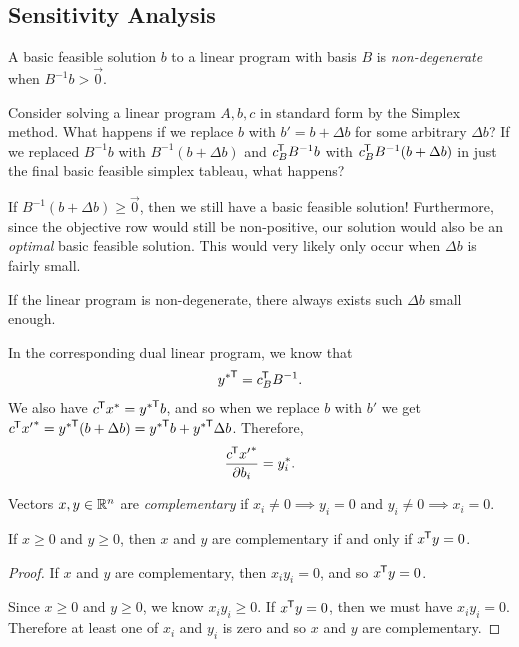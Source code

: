 \subsection{Sensitivity Analysis}

\begin{defn}
    A basic feasible solution $b$ to a linear program with basis $B$ is \emph{non-degenerate} when $B^{-1}b > \vec{0}$.
\end{defn}

Consider solving a linear program $A, b, c$ in standard form by the Simplex method. What happens if we replace $b$ with $b' = b + \Delta b$ for some arbitrary $\Delta b$? If we replaced $B^{-1}b$ with $B^{-1}(b + \Delta b)$ and $c_B^{\mkern-1.5mu\mathsf{T}}B^{-1}b$ with $c_B^{\mkern-1.5mu\mathsf{T}}B^{-1}(b + \Delta b)$ in just the final basic feasible simplex tableau, what happens?

If $B^{-1}(b + \Delta b) \geq \vec{0}$, then we still have a basic feasible solution! Furthermore, since the objective row would still be non-positive, our solution would also be an \emph{optimal} basic feasible solution. This would very likely only occur when $\Delta b$ is fairly small.

If the linear program is non-degenerate, there always exists such $\Delta b$ small enough.

In the corresponding dual linear program, we know that
\begin{align*}
    {y^*}^{\mkern-1.5mu\mathsf{T}} = c_B^{\mkern-1.5mu\mathsf{T}}B^{-1}.
\end{align*}
We also have $c^{\mkern-1.5mu\mathsf{T}}x^* = {y^*}^{\mkern-1.5mu\mathsf{T}}b$, and so when we replace $b$ with $b'$ we get
$c^{\mkern-1.5mu\mathsf{T}}{x'}^{*} = {y^*}^{\mkern-1.5mu\mathsf{T}}(b + \Delta b) = {y^*}^{\mkern-1.5mu\mathsf{T}}b + {y^*}^{\mkern-1.5mu\mathsf{T}}\Delta b$. Therefore,
\begin{align*}
    \frac{c^{\mkern-1.5mu\mathsf{T}}{x'}^{*}}{\partial b_i} = y_i^*.
\end{align*}

\begin{defn}
    Vectors $x, y \in \mathbb{R}^n$ are \emph{complementary} if $x_i \neq 0 \implies y_i = 0$ and $y_i \neq 0 \implies x_i = 0$.
\end{defn}

\begin{prop}\label{complementary-orthogonal}
    If $x \geq 0$ and $y \geq 0$, then $x$ and $y$ are complementary if and only if $x^{\mkern-1.5mu\mathsf{T}}y = 0$.
\end{prop}

\begin{proof}
    If $x$ and $y$ are complementary, then $x_iy_i = 0$, and so $x^{\mkern-1.5mu\mathsf{T}}y = 0$.

    Since $x \geq 0$ and $y \geq 0$, we know $x_iy_i \geq 0$. If $x^{\mkern-1.5mu\mathsf{T}}y = 0$, then we must have $x_iy_i = 0$. Therefore at least one of $x_i$ and $y_i$ is zero and so $x$ and $y$ are complementary.
\end{proof}

